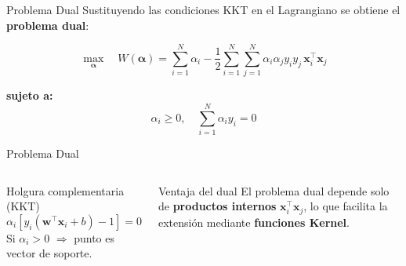 \documentclass[aspectratio=169,xcolor=dvipsnames]{beamer}
\begin{document}
\begin{frame}{Problema Dual}
    Sustituyendo las condiciones KKT en el Lagrangiano se obtiene el \textbf{problema dual}:

    \begin{equation}
        \max_{\boldsymbol{\alpha}} \quad W(\boldsymbol{\alpha}) = \sum_{i=1}^{N} \alpha_i - \frac{1}{2} \sum_{i=1}^{N} \sum_{j=1}^{N} \alpha_i \alpha_j y_i y_j \, \mathbf{x}_i^\top \mathbf{x}_j
    \end{equation}

    \textbf{sujeto a:}
    \begin{equation}
        \alpha_i \geq 0, \quad \sum_{i=1}^{N} \alpha_i y_i = 0
    \end{equation}
\end{frame}
\begin{frame}{Problema Dual}

    \begin{columns}
        \begin{block}{Holgura complementaria (KKT)}
            \begin{equation}
                \alpha_i \left[ y_i(\mathbf{w}^\top \mathbf{x}_i + b) - 1 \right] = 0
            \end{equation}
            Si $\alpha_i > 0$ $\Rightarrow$ punto es vector de soporte.
        \end{block}

        \begin{exampleblock}{Ventaja del dual}
            El problema dual depende solo de \textbf{productos internos} $\mathbf{x}_i^\top \mathbf{x}_j$, lo que facilita la extensión mediante \textbf{funciones Kernel}.
        \end{exampleblock}
    \end{columns}
\end{frame}
\end{document}
